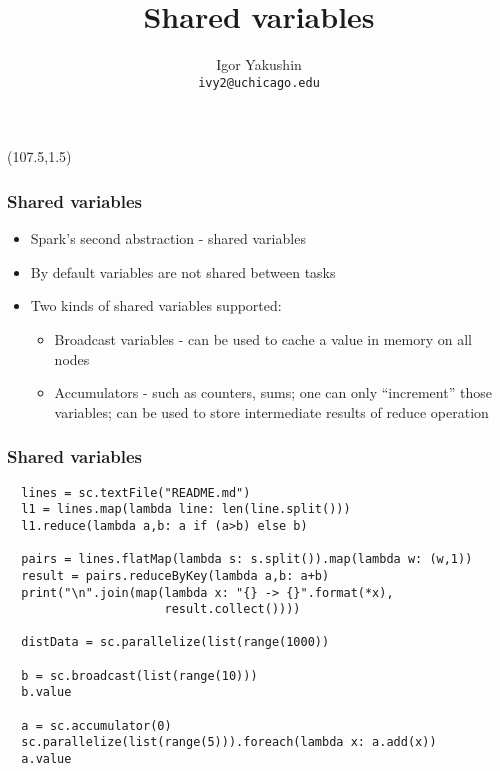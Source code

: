 \documentclass{beamer}
\title{\huge{Shared variables}}
\author{Igor Yakushin \\ \texttt{ivy2@uchicago.edu}}
\date{}
\newcommand{\SPARK}{
\begin{textblock}{14}(107.5,1.5)
  \pgfuseimage{spark}
\end{textblock}
}
\begin{document}



\begin{frame}
\SPARK
\titlepage
\end{frame}

\begin{frame}
  \frametitle{Shared variables}
  \begin{itemize}
   \item Spark's second abstraction - {\color{mycolordef}shared variables}
   \item By default variables are not shared between tasks
   \item Two kinds of shared variables supported:
    \begin{itemize}
      \item {\color{mycolordef}Broadcast variables} - can be used to cache a value in memory on all nodes
      \item {\color{mycolordef}Accumulators} - such as counters, sums;
        one can only ``increment'' those variables; can be used to store intermediate results of reduce operation
    \end{itemize}	
  \end{itemize} 
\end{frame}


\begin{frame}[fragile]
  \frametitle{Shared variables}
{\small
{\color{mycolorcode}
\begin{verbatim}
  lines = sc.textFile("README.md")
  l1 = lines.map(lambda line: len(line.split()))
  l1.reduce(lambda a,b: a if (a>b) else b)

  pairs = lines.flatMap(lambda s: s.split()).map(lambda w: (w,1))
  result = pairs.reduceByKey(lambda a,b: a+b)
  print("\n".join(map(lambda x: "{} -> {}".format(*x), 
                      result.collect())))

  distData = sc.parallelize(list(range(1000))

  b = sc.broadcast(list(range(10)))
  b.value

  a = sc.accumulator(0)
  sc.parallelize(list(range(5))).foreach(lambda x: a.add(x))
  a.value
\end{verbatim}
}
}

\end{frame}
\end{document}
